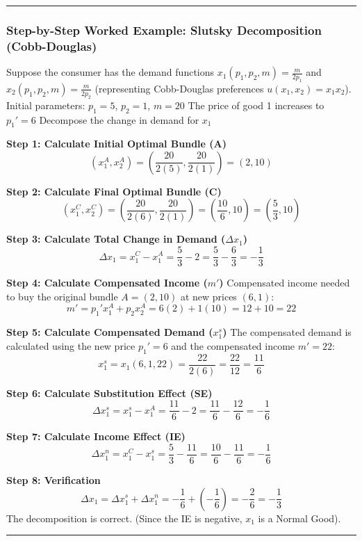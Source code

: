 \documentclass{article}
\begin{document}
\vspace{5pt}\noindent\rule{\linewidth}{0.4pt}\vspace{5pt}

\subsubsection*{Step-by-Step Worked Example: Slutsky Decomposition (Cobb-Douglas)}

Suppose the consumer has the demand functions $x_1(p_1, p_2, m) = \frac{m}{2p_1}$ and $x_2(p_1, p_2, m) = \frac{m}{2p_2}$ (representing Cobb-Douglas preferences $u(x_1, x_2) = x_1 x_2$). Initial parameters: $p_1=5$, $p_2=1$, $m=20$ The price of good 1 increases to $p_1'=6$ Decompose the change in demand for $x_1$

\textbf{Step 1: Calculate Initial Optimal Bundle (A)}
\[(x_1^A, x_2^A) = \left(\frac{20}{2(5)}, \frac{20}{2(1)}\right) = (2, 10)\]

\textbf{Step 2: Calculate Final Optimal Bundle (C)}
\[(x_1^C, x_2^C) = \left(\frac{20}{2(6)}, \frac{20}{2(1)}\right) = \left(\frac{10}{6}, 10\right) = \left(\frac{5}{3}, 10\right)\]

\textbf{Step 3: Calculate Total Change in Demand ($\Delta x_1$)}
\[\Delta x_1 = x_1^C - x_1^A = \frac{5}{3} - 2 = \frac{5}{3} - \frac{6}{3} = -\frac{1}{3}\]

\textbf{Step 4: Calculate Compensated Income ($m'$)}
Compensated income needed to buy the original bundle $A=(2, 10)$ at new prices $(6, 1)$:
\[m' = p_1' x_1^A + p_2 x_2^A = 6(2) + 1(10) = 12 + 10 = 22\]

\textbf{Step 5: Calculate Compensated Demand ($x_1^s$)}
The compensated demand is calculated using the new price $p_1'=6$ and the compensated income $m'=22$:
\[x_1^s = x_1(6, 1, 22) = \frac{22}{2(6)} = \frac{22}{12} = \frac{11}{6}\]

\textbf{Step 6: Calculate Substitution Effect (SE)}
\[\Delta x_1^s = x_1^s - x_1^A = \frac{11}{6} - 2 = \frac{11}{6} - \frac{12}{6} = -\frac{1}{6}\]

\textbf{Step 7: Calculate Income Effect (IE)}
\[\Delta x_1^n = x_1^C - x_1^s = \frac{5}{3} - \frac{11}{6} = \frac{10}{6} - \frac{11}{6} = -\frac{1}{6}\]

\textbf{Step 8: Verification}
\[\Delta x_1 = \Delta x_1^s + \Delta x_1^n = -\frac{1}{6} + \left(-\frac{1}{6}\right) = -\frac{2}{6} = -\frac{1}{3}\]
The decomposition is correct. (Since the IE is negative, $x_1$ is a Normal Good).

\vspace{5pt}\noindent\rule{\linewidth}{0.4pt}\vspace{5pt}
\end{document}
